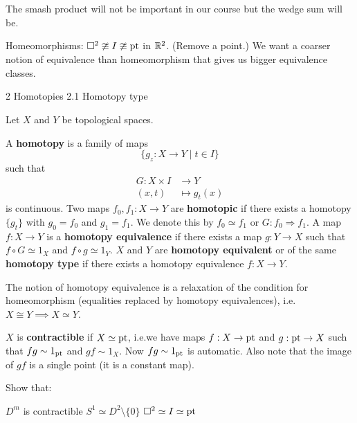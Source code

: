 \begin{rmk}
	The smash product will not be important in our course but the wedge sum will be.
\end{rmk}

Homeomorphisms:
$\square^2 \ncong I \ncong \operatorname{pt}$ in $\mathbb{R}^2$.
(Remove a point.)
We want a coarser notion of equivalence than homeomorphism that gives us bigger equivalence classes.

2 Homotopies
2.1 Homotopy type

\begin{defn}
	Let $X$ and $Y$ be topological spaces.
	\begin{enum}
		\io A \textbf{homotopy} is a family of maps
		\[\{g_z: X \to Y \mid t \in I\}\]
		such that
		\begin{align*}
			G: X \times I &\to Y \\
			(x,t) &\mapsto g_t(x)
		\end{align*}
		is continuous.
		\io Two maps $f_0,f_1: X \to Y$ are \textbf{homotopic} if there exists a homotopy $\{g_t\}$ with $g_0=f_0$ and $g_1=f_1$.
		We denote this by $f_0 \simeq f_1$ or $G: f_0 \Rightarrow f_1$.
		\io A map $f:X \to Y$ is a \textbf{homotopy equivalence} if there exists a map $g:Y \to X$ such that $f \circ G \simeq 1_X$ and $f \circ g \simeq 1_Y$.
		\io $X$ and $Y$ are \textbf{homotopy equivalent} or of the same \textbf{homotopy type} if there exists a homotopy equivalence $f: X \to Y$.
	\end{enum}
\end{defn}

\begin{rmk}
	The notion of homotopy equivalence is a relaxation of the condition for homeomorphism (equalities replaced by homotopy equivalences), i.e.\@ $X \cong Y \implies X \simeq Y$.
\end{rmk}

\begin{defn}
	$X$ is \textbf{contractible} if $X \simeq \operatorname{pt}$, i.e.\@ we have maps $f: X \to \operatorname{pt}$ and $g: \operatorname{pt} \to X$ such that $fg \sim 1_{\operatorname{pt}}$ and $gf \sim 1_X$.
	Now $fg \sim 1_{\operatorname{pt}}$ is automatic.
	Also note that the image of $gf$ is a single point (it is a constant map).
\end{defn}

\begin{exer}
	Show that:
	\begin{itm}
		\io $D^m$ is contractible
		\io $S^1 \simeq D^2 \setminus \{0\}$
		\io $\square^2 \simeq I \simeq \operatorname{pt}$
	\end{itm}
\end{exer}

